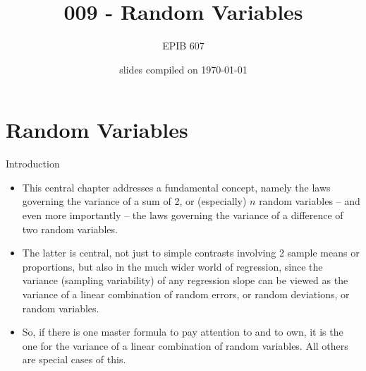 \documentclass[10pt,handout]{beamer}\usepackage[]{graphicx}\usepackage[]{color}
\begin{document}

\title{009 - Random Variables}
\author{EPIB 607}

\date{slides compiled on \today}

\maketitle

\section{Random Variables}

\begin{frame}{Introduction}

	\begin{itemize}
					  \setlength{\itemsep}{10pt}
		\item  This central chapter addresses a fundamental concept, namely the laws governing the variance of a sum of 2, or (especially) $n$ random variables  -- and even more importantly -- the laws governing the variance of a difference of two random variables. 
		\item The latter is  central, not just to simple contrasts involving 2 sample means or proportions, but also in the much wider world of regression, since the variance (sampling variability) of any regression slope can be viewed as the variance of a linear combination of random errors, or random deviations, or random variables.
		\item So, if there is one master formula to pay attention to and to own, it is the one for the variance of a linear combination of random variables. All others are special cases of this.
	\end{itemize}
	
\end{frame}
\end{document}
